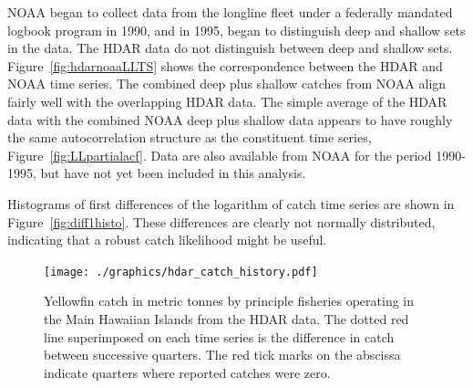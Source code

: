 \documentclass[12pt,letterpaper,twoside]{article}
\begin{document}
NOAA began to collect data from the longline fleet under a federally
mandated logbook program in 1990, and in 1995, began to distinguish
deep and shallow sets in the data. The HDAR data do not
distinguish between deep and shallow sets.
Figure~\ref{fig:hdarnoaaLLTS} shows the correspondence between the
HDAR and NOAA time series. The combined deep plus shallow catches from
NOAA align fairly well with the overlapping HDAR data. The simple
average of the HDAR data with the combined NOAA deep plus shallow data
appears to have roughly the same autocorrelation structure as the
constituent time series, Figure~\ref{fig:LLpartialacf}.
Data are also available from NOAA for the period 1990-1995, but
have not yet been included in this analysis.

Histograms of first differences of the logarithm of catch time series
are shown in Figure~\ref{fig:diff1histo}. These differences are
clearly not normally distributed, indicating that a robust catch
likelihood might be useful.

\begin{figure}
\begin{center}
\texttt{[image: ./graphics/hdar\_catch\_history.pdf]}
\caption{\label{fig:hdarTS}
Yellowfin catch in metric tonnes by principle fisheries operating in
the Main Hawaiian Islands from the HDAR data.
The dotted red line superimposed on each time series is the difference in
catch between successive quarters.
The red tick marks on the abscissa indicate quarters where reported
catches were zero.
}
\end{center}
\end{figure}
\end{document}
